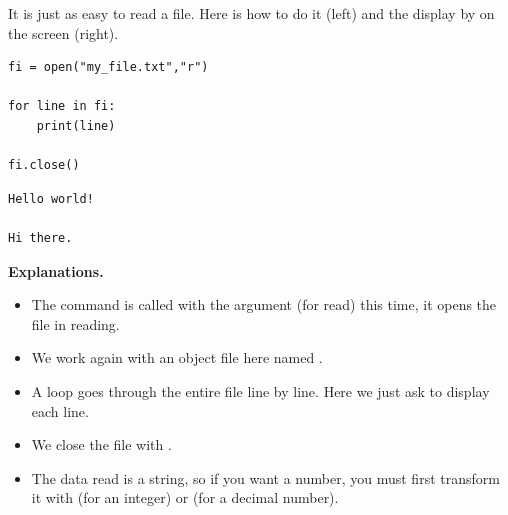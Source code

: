 \documentclass[11pt,class=report,crop=false]{standalone}
\begin{document}
\begin{cours}

It is just as easy to read a file.
Here is how to do it (left) and the display by \Python{} on the screen (right).
\begin{center}
\begin{minipage}{0.5\textwidth}
\begin{lstlisting}
fi = open("my_file.txt","r")

for line in fi:
    print(line)

fi.close()
\end{lstlisting}
\end{minipage}
\begin{minipage}{0.3\textwidth}
\begin{lstlisting}
Hello world!

Hi there.
\end{lstlisting}
\end{minipage}
\end{center}

\textbf{Explanations.}
\begin{itemize}
  \item The command  is called with the argument  (for read) this time, it opens the file in reading.
  
  \item We work again with an object file here named .
  
  \item A loop goes through the entire file line by line. Here we just ask to display each line.
  
  \item We close the file with .  
  
  \item The data read is a string, so if you want a number, you must first transform it with  (for an integer) or  
   (for a decimal number).

\end{itemize}
  
\end{cours}



\end{document}

